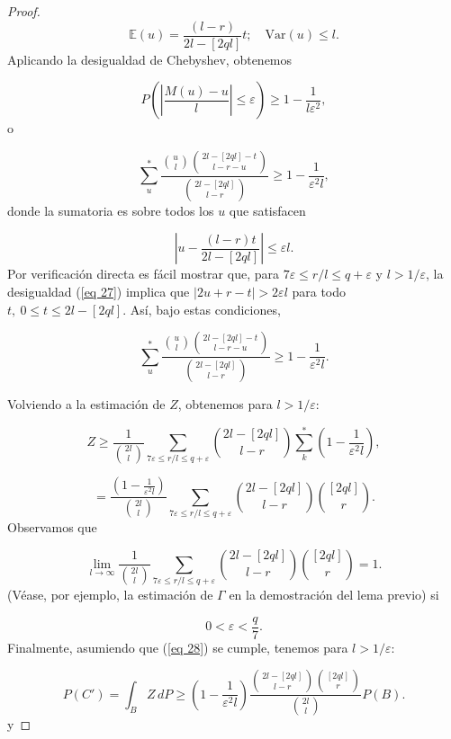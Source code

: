 \documentclass{report}
\begin{document}
\begin{proof}
\[
\mathbb{E}(u) = \frac{(l - r)}{2l - [2q l]} t; \quad \text{Var}(u) \leq l.
\]
Aplicando la desigualdad de Chebyshev, obtenemos

\[
P \left( \left| \frac{M(u) - u}{l} \right| \leq \varepsilon \right) \geq 1 - \frac{1}{l \varepsilon^2},
\]
o 

\[
\sum_u^* \frac{\binom{u}{l} \binom{2l - [2q l] - t}{l - r - u}}{\binom{2l - [2q l]}{l - r}} \geq 1 - \frac{1}{\varepsilon^2 l},
\]
donde la sumatoria es sobre todos los \( u \) que satisfacen

\begin{equation}\label{eq 27}
    \left| u - \frac{(l - r) t}{2l - [2q l]} \right| \leq \varepsilon l.
\end{equation}
Por verificación directa es fácil mostrar que, para \( 7 \varepsilon \leq r/l \leq q + \varepsilon \) y \( l > 1/\varepsilon \),
la desigualdad (\ref{eq 27}) implica que \( |2u + r - t| > 2 \varepsilon l \) para todo \( t, \ 0 \leq t \leq 2l - [2q l] \).
Así, bajo estas condiciones,

\[
\sum_u^* \frac{\binom{u}{l} \binom{2l - [2q l] - t}{l - r - u}}{\binom{2l - [2q l]}{l - r}} \geq 1 - \frac{1}{\varepsilon^2 l}.
\]\newline

Volviendo a la estimación de \( Z \), obtenemos para \( l > 1/\varepsilon \):

\[
Z \geq \frac{1}{\binom{2l}{l}} \sum_{7 \varepsilon \leq r/l \leq q + \varepsilon} \binom{2l - [2q l]}{l - r} \sum_k^* \left( 1 - \frac{1}{\varepsilon^2 l} \right),
\]

\[
= \frac{\left( 1 - \frac{1}{\varepsilon^2 l} \right)}{\binom{2l}{l}} \sum_{7 \varepsilon \leq r/l \leq q + \varepsilon} \binom{2l - [2q l]}{l - r} \binom{[2q l]}{r}.
\]
Observamos que

\[
\lim_{l \to \infty} \frac{1}{\binom{2l}{l}} \sum_{7 \varepsilon \leq r/l \leq q + \varepsilon} \binom{2l - [2q l]}{l - r} \binom{[2q l]}{r} = 1.
\]
(Véase, por ejemplo, la estimación de \( \Gamma \) en la demostración del lema previo) si 

\begin{equation}\label{eq 28}
0 < \varepsilon < \frac{q}{7}.
\end{equation}
Finalmente, asumiendo que (\ref{eq 28}) se cumple, tenemos para \( l > 1/\varepsilon \):

\[
P(C') = \int_B Z \, dP \geq \left( 1 - \frac{1}{\varepsilon^2 l} \right) \frac{\binom{2l - [2q l]}{l - r} \binom{[2q l]}{r}}{\binom{2l}{l}} P(B).
\]
y 


\end{proof}
\end{document}
